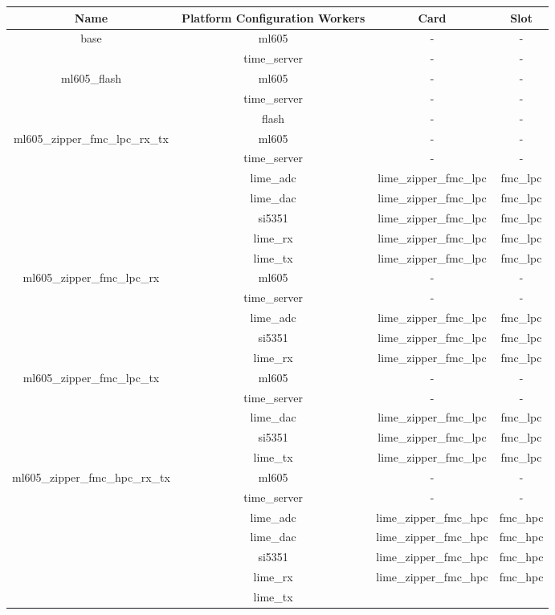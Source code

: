 \documentclass{article}
\begin{document}
\begin{tabular}{|c|c|c|c|}
	\hline
	\rowcolor{blue}
	Name & Platform Configuration Workers & Card & Slot \\
	\hline
	\multirow{2}{*}{base} &ml605 & - & - \\ &time\_server & - & - \\
	\hline
	\multirow{2}{*}{ml605\_flash} &ml605 & - & - \\ &time\_server & -
	& - \\ &flash & - & - \\
	\hline
	\multirow{5}{*}{ml605\_zipper\_fmc\_lpc\_rx\_tx}&
	ml605 & - & - \\ &time\_server & - & - \\
	&lime\_adc & lime\_zipper\_fmc\_lpc & fmc\_lpc \\ &lime\_dac &
	lime\_zipper\_fmc\_lpc & fmc\_lpc \\ &si5351 &
	lime\_zipper\_fmc\_lpc & fmc\_lpc \\ &lime\_rx &
	lime\_zipper\_fmc\_lpc & fmc\_lpc \\ &lime\_tx &
	lime\_zipper\_fmc\_lpc & fmc\_lpc \\
	\hline
	\multirow{5}{*}{ml605\_zipper\_fmc\_lpc\_rx}&
	ml605 & - & - \\ &time\_server & - & - \\
	&lime\_adc & lime\_zipper\_fmc\_lpc & fmc\_lpc \\  &si5351 &
	lime\_zipper\_fmc\_lpc & fmc\_lpc \\ &lime\_rx &
	lime\_zipper\_fmc\_lpc & fmc\_lpc \\
	\hline
	\multirow{5}{*}{ml605\_zipper\_fmc\_lpc\_tx}&
	ml605 & - & - \\ &time\_server & - & - \\
	&lime\_dac & lime\_zipper\_fmc\_lpc & fmc\_lpc \\  &si5351 &
	lime\_zipper\_fmc\_lpc & fmc\_lpc \\ &lime\_tx &
	lime\_zipper\_fmc\_lpc & fmc\_lpc \\
	\hline
	\multirow{5}{*}{ml605\_zipper\_fmc\_hpc\_rx\_tx}&
	ml605 & - & - \\ &time\_server & - & - \\
	&lime\_adc & lime\_zipper\_fmc\_hpc & fmc\_hpc \\ &lime\_dac &
	lime\_zipper\_fmc\_hpc & fmc\_hpc \\ &si5351 &
	lime\_zipper\_fmc\_hpc & fmc\_hpc \\ &lime\_rx &
	lime\_zipper\_fmc\_hpc & fmc\_hpc \\ &lime\_tx &

\end{tabular}
\end{document}
